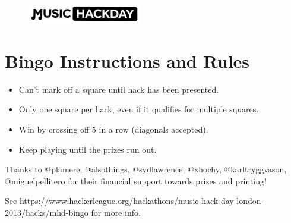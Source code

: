 \documentclass[a4]{article}
\def\Sequence{1, 2, 3, 4, 5}%
\newcommand{\Size}{2.75cm}
\begin{document}



\begin{figure}[h]
    \centering
    \includegraphics[width=5cm]{./mhdlogo.jpg}
\end{figure}


\section*{Bingo Instructions and Rules}
\begin{itemize}
\item Can't mark off a square until hack has been presented.
\item Only one square per hack, even if it qualifies for multiple squares.
\item Win by crossing off 5 in a row (diagonals accepted).
\item Keep playing until the prizes run out.
\end{itemize}

\vspace{1cm}

\begin{center}
\end{center}

\vspace{1cm}
\noindent
Thanks to @plamere, @alsothings, @sydlawrence, @xhochy, @karltryggvason, @miguelpellitero for their financial support towards prizes and printing!

\noindent
See https://www.hackerleague.org/hackathons/music-hack-day-london-2013/hacks/mhd-bingo for more info.
\end{document}
